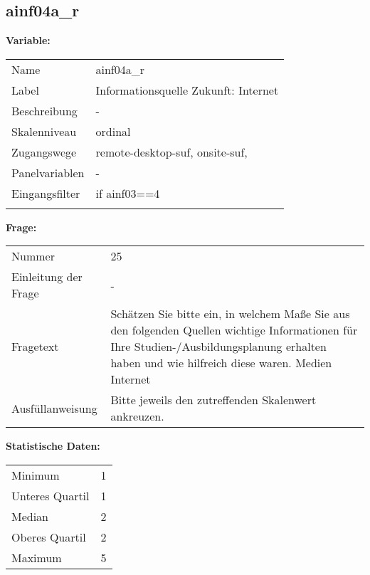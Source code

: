	
	
	\subsection{ainf04a\_r}
	\label{subSection:ainf04a_r}

	\noindent\textbf{Variable:}\\
		\begin{tabular}{lL{11.3cm}}
			\label{tableVariable:ainf04a_r}
			Name & ainf04a\_r \\
			Label & Informationsquelle Zukunft: Internet \\
			Beschreibung & - \\
			Skalenniveau & ordinal \\
			Zugangswege &
				remote-desktop-suf,
				onsite-suf,
 \\
			Panelvariablen & -
			 \\
			Eingangsfilter & if ainf03==4 \\
 \\
		\end{tabular}

		\vspace*{1 cm}
		\noindent\textbf{Frage:}\\
		\begin{tabular}{lL{11.3cm}}
			\label{tableQuestion:ainf04a_r}
			Nummer & 25 \\
			Einleitung der Frage & - \\
			Fragetext & Schätzen Sie bitte ein, in welchem Maße Sie aus den folgenden Quellen wichtige Informationen für Ihre Studien-/Ausbildungsplanung erhalten haben und wie hilfreich diese waren.
Medien
Internet \\
			Ausfüllanweisung & Bitte jeweils den zutreffenden Skalenwert ankreuzen. \\
		\end{tabular}


		\vspace*{1 cm}
		\noindent\textbf{Statistische Daten:}\\
			\begin{tabular}{ll}
				\label{tableStatistics:ainf04a_r}
					Minimum & 1 \\
					Unteres Quartil & 1 \\
					Median & 2 \\
					Oberes Quartil & 2 \\
					Maximum & 5 \\
			\end{tabular}



